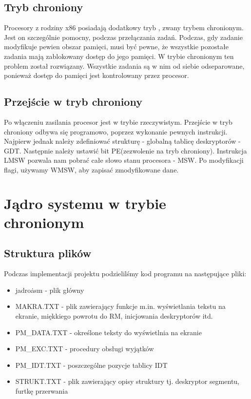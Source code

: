 \documentclass[a4paper,12pt]{article}
\begin{document}
	
	
	\subsection{Tryb chroniony}
	Procesory z rodziny x86  posiadają dodatkowy tryb , zwany trybem chronionym. Jest on szczególnie pomocny, podczas przełączania zadań. Podczas, gdy zadanie modyfikuje pewien obszar pamięci, musi być pewne, że wszystkie pozostałe zadania mają zablokowany dostęp do jego pamięci. W trybie chronionym ten problem został rozwiązany. Wszystkie zadania są w nim od siebie odseparowane, ponieważ dostęp do pamięci jest kontrolowany przez procesor. 

	\subsection{Przejście w tryb chroniony}
	Po włączeniu zasilania procesor jest w trybie rzeczywistym. Przejście w tryb chroniony odbywa się programowo, poprzez wykonanie pewnych instrukcji. Najpierw jednak należy zdefiniować strukturę - globalną tablicę deskryptorów - GDT.  Następnie należy ustawić bit PE(zezwolenie na tryb chroniony). Instrukcja LMSW pozwala nam pobrać całe słowo stanu procesora -  MSW. Po modyfikacji flagi, używamy WMSW, aby zapisać zmodyfikowane dane.
	
	\section{Jądro systemu w trybie chronionym}
	\subsection{Struktura plików}
		Podczas implementacji projektu podzielilśmy kod programu na następujące pliki:
		\begin{itemize}
			\item{jadro\.asm - plik główny}
			\item{MAKRA.TXT - plik zawierający funkcje m.in. wyświetlania tekstu na ekranie, miękkiego powrotu do RM, inicjowania deskryptorów itd.  }
			\item{PM\_DATA.TXT - określone teksty do wyświetlnia na ekranie}
			\item{PM\_EXC.TXT - procedury obsługi wyjątków}
			\item{PM\_IDT.TXT - poszczególne pozycje tablicy IDT}
			\item{STRUKT.TXT - plik zawierający opisy struktury tj. deskryptor segmentu, furtkę przerwania}
		\end{itemize}
\end{document}
